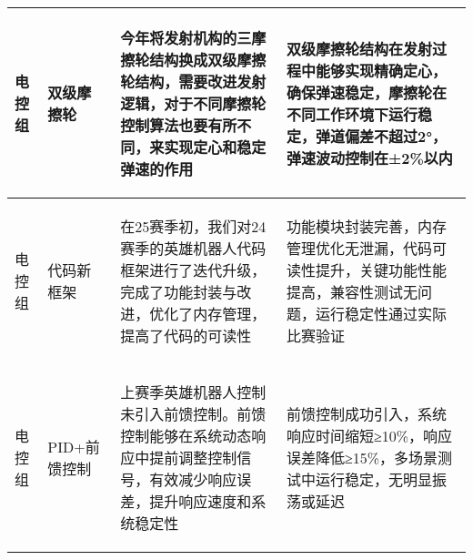 \begin{longtable}{ p{1.5cm} | p{3cm} | p{6cm} | p{4.3cm} |}
    \hline

       \begin{center}
           电控组
       \end{center} &
       \begin{center}
           双级摩擦轮
       \end{center} &
       \begin{center}
           今年将发射机构的三摩擦轮结构换成双级摩擦轮结构，需要改进发射逻辑，对于不同摩擦轮控制算法也要有所不同，来实现定心和稳定弹速的作用
       \end{center} &
       \begin{center}
           双级摩擦轮结构在发射过程中能够实现精确定心，确保弹速稳定，摩擦轮在不同工作环境下运行稳定，弹道偏差不超过2°，弹速波动控制在±2\%以内
       \end{center} \\
        
    \hline
    
        \begin{center}
            电控组
        \end{center}&
        \begin{center}
            代码新框架
        \end{center}&
        \begin{center}
            在25赛季初，我们对24赛季的英雄机器人代码框架进行了迭代升级，完成了功能封装与改进，优化了内存管理，提高了代码的可读性
        \end{center}&
        \begin{center}
            功能模块封装完善，内存管理优化无泄漏，代码可读性提升，关键功能性能提高，兼容性测试无问题，运行稳定性通过实际比赛验证
        \end{center}\\

    \hline
    

       \begin{center}
           电控组
       \end{center} &
       \begin{center}
           PID+前馈控制
       \end{center} &
       \begin{center}
           上赛季英雄机器人控制未引入前馈控制。前馈控制能够在系统动态响应中提前调整控制信号，有效减少响应误差，提升响应速度和系统稳定性
       \end{center} &
       \begin{center}
           前馈控制成功引入，系统响应时间缩短≥10\%，响应误差降低≥15\%，多场景测试中运行稳定，无明显振荡或延迟
       \end{center} \\


\end{longtable}
